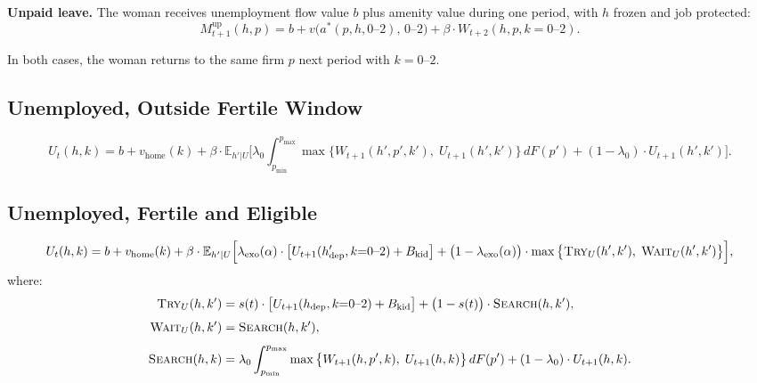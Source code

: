 \documentclass[11pt]{article}
\newcommand{\E}{\mathbb{E}}
\begin{document}
\textbf{Unpaid leave.} The woman receives unemployment flow value $b$ plus amenity value during one period, with $h$ frozen and job protected:
\begin{equation}\label{eq:M_unpaid}
  M^{\text{up}}_{t+1}(h, p) = b + v\big(a^*(p, h, 0\text{--}2),\, 0\text{--}2\big) + \beta \cdot W_{t+2}(h, p, k{=}0\text{--}2).
\end{equation}

\noindent In both cases, the woman returns to the same firm $p$ next period with $k = 0\text{--}2$.

\subsection{Unemployed, Outside Fertile Window}

\begin{equation}\label{eq:U_nonfertile}
  U_t(h, k) = b + v_{\text{home}}(k) + \beta \cdot \E_{h'|U}\bigg[
    \lambda_0 \int_{p_{\min}}^{p_{\max}} \max\big\{W_{t+1}(h', p', k'),\; U_{t+1}(h', k')\big\}\, dF(p')
    + (1 - \lambda_0) \cdot U_{t+1}(h', k')
  \bigg].
\end{equation}

\subsection{Unemployed, Fertile and Eligible}

\begin{equation}\label{eq:U_fertile}
  U_t(h, k) = b + v_{\text{home}}(k) + \beta \cdot \E_{h'|U}\Big[
    \lambda_{\text{exo}}(\alpha) \cdot \big[U_{t+1}(h'_{\text{dep}}, k{=}0\text{--}2) + B_{\text{kid}}\big]
    + \big(1 - \lambda_{\text{exo}}(\alpha)\big) \cdot \max\big\{\textsc{Try}_U(h', k'),\; \textsc{Wait}_U(h', k')\big\}
  \Big],
\end{equation}
where:
\begin{align}
  \textsc{Try}_U(h, k') &= s(t) \cdot \big[U_{t+1}(h_{\text{dep}}, k{=}0\text{--}2) + B_{\text{kid}}\big]
    + \big(1 - s(t)\big) \cdot \textsc{Search}(h, k'), \label{eq:TRY_U}\\[4pt]
  \textsc{Wait}_U(h, k') &= \textsc{Search}(h, k'), \label{eq:WAIT_U}\\[4pt]
  \textsc{Search}(h, k) &= \lambda_0 \int_{p_{\min}}^{p_{\max}} \max\big\{W_{t+1}(h, p', k),\; U_{t+1}(h, k)\big\}\, dF(p')
    + (1 - \lambda_0) \cdot U_{t+1}(h, k). \label{eq:SEARCH}
\end{align}
\end{document}
